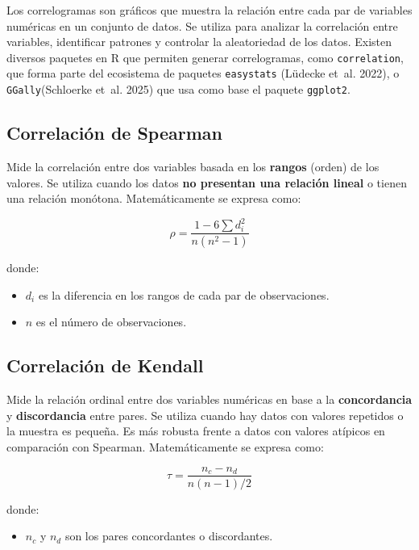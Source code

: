\documentclass[
  spanish,
  a4paper,
]{scrbook}
\providecommand{\tightlist}{%
  \setlength{\itemsep}{0pt}\setlength{\parskip}{0pt}}
\begin{document}
Los correlogramas son gráficos que muestra la relación entre cada par de
variables numéricas en un conjunto de datos. Se utiliza para analizar la
correlación entre variables, identificar patrones y controlar la
aleatoriedad de los datos. Existen diversos paquetes en R que permiten
generar correlogramas, como \texttt{correlation}, que forma parte del
ecosistema de paquetes \texttt{easystats} (Lüdecke et~al. 2022), o
\texttt{GGally}(Schloerke et~al. 2025) que usa como base el paquete
\texttt{ggplot2}.

\subsection{Correlación de Spearman}\label{correlaciuxf3n-de-spearman}

Mide la correlación entre dos variables basada en los \textbf{rangos}
(orden) de los valores. Se utiliza cuando los datos \textbf{no presentan
una relación lineal} o tienen una relación monótona. Matemáticamente se
expresa como:

\[
\rho = \frac{1 - 6\sum d_i^2}{n(n^2-1)}
\]

donde:

\begin{itemize}
\item
  \(d_i\) es la diferencia en los rangos de cada par de observaciones.
\item
  \(n\) es el número de observaciones.
\end{itemize}

\subsection{Correlación de Kendall}\label{correlaciuxf3n-de-kendall}

Mide la relación ordinal entre dos variables numéricas en base a la
\textbf{concordancia} y \textbf{discordancia} entre pares. Se utiliza
cuando hay datos con valores repetidos o la muestra es pequeña. Es más
robusta frente a datos con valores atípicos en comparación con Spearman.
Matemáticamente se expresa como:

\[
\tau = \frac{n_c - n_d}{n(n-1)/2}
\]

donde:

\begin{itemize}
\tightlist
\item
  \(n_c\) y \(n_d\) son los pares concordantes o discordantes.
\end{itemize}
\end{document}
